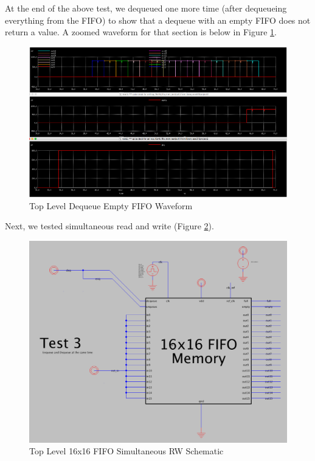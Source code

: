 \documentclass[a4paper]{article}
\begin{document}
At the end of the above test, we dequeued one more time (after dequeueing everything from the FIFO) to show that a dequeue with an empty FIFO does not return a value. A zoomed waveform for that section is below in Figure \ref{fig:topLevelTestDeqAfterEmptyWaveform}.

\begin{figure}[H]
	\centering
	\includegraphics[scale=0.25]{topLevelTestDeqAfterEmptyWaveform}
	\caption{Top Level Dequeue Empty FIFO Waveform}
	\label{fig:topLevelTestDeqAfterEmptyWaveform}
\end{figure}

Next, we tested simultaneous read and write (Figure \ref{fig:topLevelTest3Schematic}).

\begin{figure}[H]
	\centering
	\includegraphics[scale=0.25]{topLevelTest3Schematic}
	\caption{Top Level 16x16 FIFO Simultaneous RW Schematic}
	\label{fig:topLevelTest3Schematic}
\end{figure}
\end{document}
